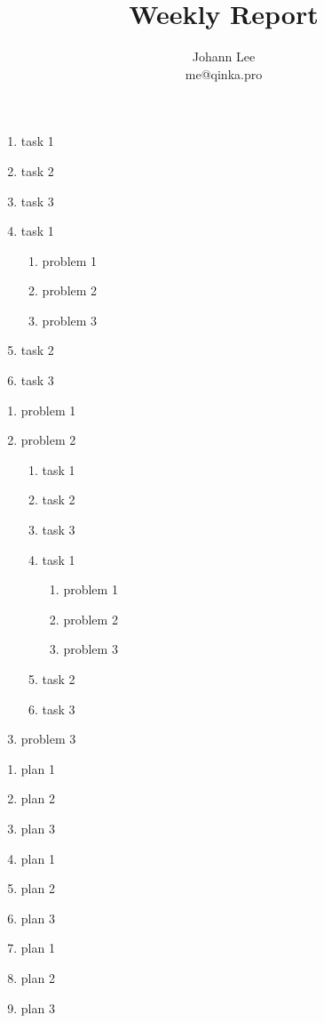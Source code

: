 \documentclass{weekly}
\title{Weekly Report}
\author{Johann Lee \\ me@qinka.pro}
\begin{document}
    \maketitle
    \thisweektask
        \begin{enumerate}
            \item task 1
            \item task 2
            \item task 3
            \item task 1
              \begin{enumerate}
              \item problem 1
              \item problem 2
              \item problem 3
              \end{enumerate}
            \item task 2
            \item task 3
        \end{enumerate}
    \thisweekproblem
        \begin{enumerate}
            \item problem 1
            \item problem 2
              \begin{enumerate}
              \item task 1
              \item task 2
              \item task 3
              \item task 1
                \begin{enumerate}
                \item problem 1
                \item problem 2
                \item problem 3
                \end{enumerate}
              \item task 2
              \item task 3
              \end{enumerate}
            \item problem 3
            \end{enumerate}
    \nextweekplan
        \begin{enumerate}
            \item plan 1
            \item plan 2
            \item plan 3
            \item plan 1
            \item plan 2
            \item plan 3
            \item plan 1
            \item plan 2
            \item plan 3
        \end{enumerate}
\end{document}
